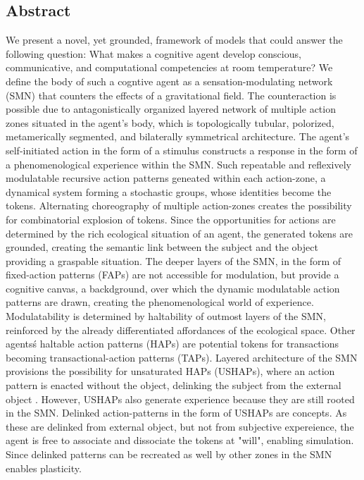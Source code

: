 \documentclass[10pt,letterpaper]{article}
\begin{document}
\subsection*{Abstract}
We present a novel, yet grounded, framework of models that could
answer the following question: What makes a cognitive agent develop
conscious, communicative, and computational competencies at room
temperature? We define the body of such a cogntive agent as a
sensation-modulating network (SMN) that counters the effects of a
gravitational field.  The counteraction is possible due to
antagonistically organized layered network of multiple action zones
situated in the agent's body, which is topologically tubular,
polorized, metamerically segmented, and bilaterally symmetrical
architecture.  The agent's self-initiated action in the form of a
stimulus constructs a response in the form of a phenomenological
experience within the SMN.  Such repeatable and reflexively
modulatable recursive action patterns geneated within each
action-zone, a dynamical system forming a stochastic groups, whose
identities become the tokens.  Alternating choreography of multiple
action-zones creates the possibility for combinatorial explosion of
tokens. Since the opportunities for actions are determined by the rich
ecological situation of an agent, the generated tokens are grounded,
creating the semantic link between the subject and the object
providing a graspable situation.  The deeper layers of the SMN, in the
form of fixed-action patterns (FAPs) are not accessible for
modulation, but provide a cognitive canvas, a backdground, over which
the dynamic modulatable action patterns are drawn, creating the
phenomenological world of experience.  Modulatability is determined by
haltability of outmost layers of the SMN, reinforced by the already
differentiated affordances of the ecological space.  Other agents\'s
haltable action patterns (HAPs) are potential tokens for transactions
becoming transactional-action patterns (TAPs).  Layered architecture
of the SMN provisions the possibility for unsaturated HAPs (USHAPs),
where an action pattern is enacted without the object, delinking the
subject from the external object .  However, USHAPs also generate
experience because they are still rooted in the SMN.  Delinked
action-patterns in the form of USHAPs are concepts.  As these are
delinked from external object, but not from subjective expereience,
the agent is free to associate and dissociate the tokens at "will",
enabling simulation.  Since delinked patterns can be recreated as well
by other zones in the SMN enables plasticity.
\end{document}
